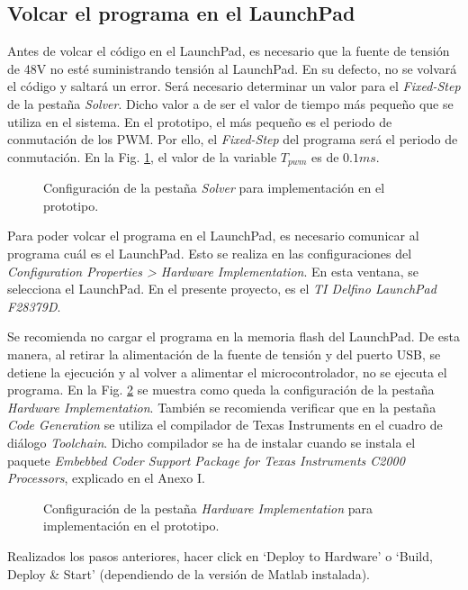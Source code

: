 \documentclass{report}
\begin{document}
\clearpage
\subsection{Volcar el programa en el LaunchPad} \label{sec.volvarcodigo}

Antes de volcar el código en el LaunchPad, es necesario que la fuente de tensión de 48V no esté suministrando tensión al LaunchPad. En su defecto, no se volvará el código y saltará un error. 
Será necesario determinar un valor para el \textit{Fixed-Step} de la pestaña \textit{Solver}. Dicho valor a de ser el valor de tiempo más pequeño que se utiliza en el sistema. En el prototipo, el más pequeño es el periodo de conmutación de los PWM. Por ello, el \textit{Fixed-Step} del programa será el periodo de conmutación. En la Fig. \ref{fig.fixedstep}, el valor de la variable $T_{pwm}$ es de $0.1ms$.

\begin{figure}[!h]
    \begin{center}
    \caption{Configuración de la pestaña \textit{Solver} para implementación en el prototipo.}
    \label{fig.fixedstep}
    \end{center}
\end{figure}
Para poder volcar el programa en el LaunchPad, es necesario comunicar al programa cuál es el LaunchPad. Esto se realiza en las configuraciones del \textit{Configuration Properties > Hardware Implementation}. En esta ventana, se selecciona el LaunchPad. En el presente proyecto, es el \textit{TI Delfino LaunchPad F28379D}.

Se recomienda no cargar el programa en la memoria flash del LaunchPad. De esta manera, al retirar la alimentación de la fuente de tensión y del puerto USB, se detiene la ejecución y al volver a alimentar el microcontrolador, no se ejecuta el programa. En la Fig. \ref{fig.volcar_programa} se muestra como queda la configuración de la pestaña \textit{Hardware Implementation}. También se recomienda verificar que en la pestaña \textit{Code Generation} se utiliza el compilador de Texas Instruments en el cuadro de diálogo \textit{Toolchain}. Dicho compilador se ha de instalar cuando se instala el paquete \textit{Embebbed Coder Support Package for Texas Instruments C2000 Processors}, explicado en el Anexo I.

\begin{figure}[!h]
    \begin{center}
    \caption{Configuración de la pestaña \textit{Hardware Implementation} para implementación en el prototipo.}
    \label{fig.volcar_programa}
    \end{center}
\end{figure}
Realizados los pasos anteriores, hacer click en `Deploy to Hardware' o `Build, Deploy \& Start' (dependiendo de la versión de Matlab instalada).
\end{document}
